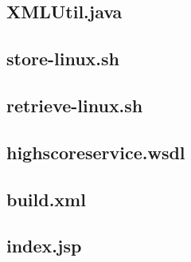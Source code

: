 \documentclass[a4paper, 12pt]{article}
\begin{document}
\newpage
\subsection{XMLUtil.java}\label{XMLUtil.java}
\begin{footnotesize}
  
\end{footnotesize}

\newpage
\subsection{store-linux.sh}\label{store-linux.sh}
\begin{footnotesize}
  
\end{footnotesize}

\newpage
\subsection{retrieve-linux.sh}\label{etrieve-linux.sh}
\begin{footnotesize}
  
\end{footnotesize}

\newpage
\subsection{highscoreservice.wsdl}\label{highscoreservice.wsdl}
\begin{footnotesize}
  
\end{footnotesize}

\newpage
\subsection{build.xml}\label{build.xml}
\begin{footnotesize}
  
\end{footnotesize}

\newpage
\subsection{index.jsp}\label{index.jsp}
\begin{footnotesize}
  
\end{footnotesize}
\end{document}

